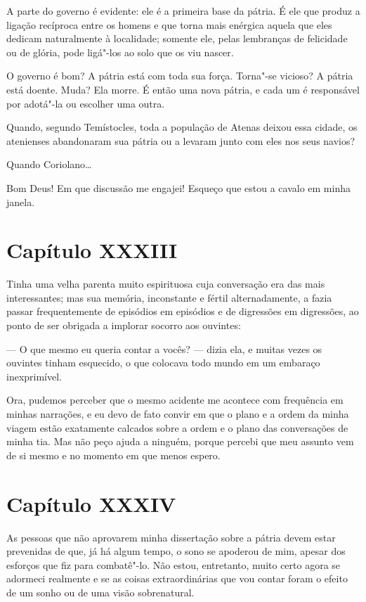  A parte do governo é evidente: ele é a primeira base da pátria. É ele
que produz a ligação recíproca entre os homens e que torna mais
enérgica aquela que eles dedicam naturalmente à localidade; somente
ele, pelas lembranças de felicidade ou de glória, pode ligá"-los ao solo
que os viu nascer.

 O governo é bom? A pátria está com toda sua força. Torna"-se vicioso? A
pátria está doente. Muda? Ela morre. É então uma nova pátria, e cada um
é responsável por adotá"-la ou escolher uma outra.

 Quando, segundo Temístocles, toda a população de Atenas deixou essa
cidade, os atenienses abandonaram sua pátria ou a levaram junto com
eles nos seus navios?

 Quando Coriolano\ldots

 Bom Deus! Em que discussão me engajei! Esqueço que estou a cavalo em
minha janela.

\section*{Capítulo XXXIII}

 Tinha uma velha parenta muito espirituosa cuja conversação era das mais
interessantes; mas sua memória, inconstante e fértil alternadamente, a
fazia passar frequentemente de episódios em episódios e de digressões
em digressões, ao ponto de ser obrigada a implorar socorro aos
ouvintes:

 --- O que mesmo eu queria contar a vocês? --- dizia ela, e muitas vezes os
ouvintes tinham esquecido, o que colocava todo mundo em um embaraço
inexprimível.

 Ora, pudemos perceber que o mesmo acidente me acontece com frequência
em minhas narrações, e eu devo de fato convir em que o plano e a ordem
da minha viagem estão exatamente calcados sobre a ordem e o plano das
conversações de minha tia. Mas não peço ajuda a ninguém, porque percebi
que meu assunto vem de si mesmo e no momento em que menos espero.

\section*{Capítulo XXXIV}

 As pessoas que não aprovarem minha dissertação sobre a pátria devem
estar prevenidas de que, já há algum tempo, o sono se apoderou de mim,
apesar dos esforços que fiz para combatê"-lo. Não estou, entretanto,
muito certo agora se adormeci realmente e se as coisas extraordinárias
que vou contar foram o efeito de um sonho ou de uma visão sobrenatural.

